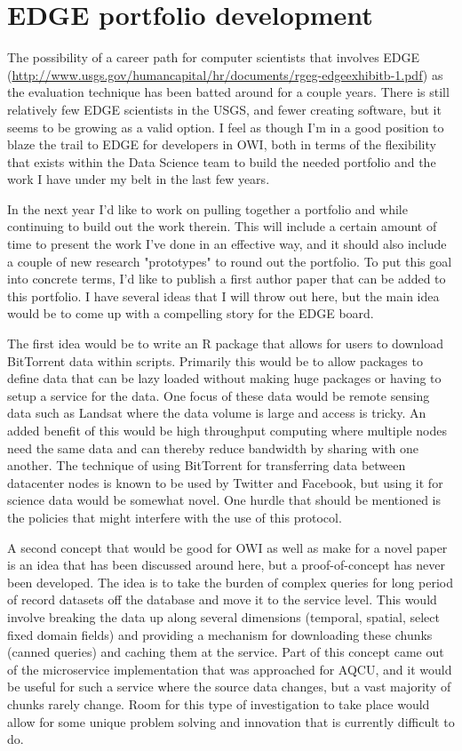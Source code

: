 \documentclass{article}
\begin{document}
\section{EDGE portfolio development}

The possibility of a career path for computer scientists that involves EDGE (\url{http://www.usgs.gov/humancapital/hr/documents/rgeg-edgeexhibitb-1.pdf}) as the evaluation technique has been batted around for a couple years.
There is still relatively few EDGE scientists in the USGS, and fewer creating software, but it seems to be growing as a valid option.
I feel as though I'm in a good position to blaze the trail to EDGE for developers in OWI, both in terms of the flexibility that exists within the Data Science team to build the needed portfolio and the work I have under my belt in the last few years.

In the next year I'd like to work on pulling together a portfolio and while continuing to build out the work therein.
This will include a certain amount of time to present the work I've done in an effective way, and it should also include a couple of new research "prototypes" to round out the portfolio.
To put this goal into concrete terms, I'd like to publish a first author paper that can be added to this portfolio.
I have several ideas that I will throw out here, but the main idea would be to come up with a compelling story for the EDGE board.

The first idea would be to write an R package that allows for users to download BitTorrent data within scripts.
Primarily this would be to allow packages to define data that can be lazy loaded without making huge packages or having to setup a service for the data.
One focus of these data would be remote sensing data such as Landsat where the data volume is large and access is tricky.
An added benefit of this would be high throughput computing where multiple nodes need the same data and can thereby reduce bandwidth by sharing with one another.
The technique of using BitTorrent for transferring data between datacenter nodes is known to be used by Twitter and Facebook, but using it for science data would be somewhat novel.
One hurdle that should be mentioned is the policies that might interfere with the use of this protocol.

A second concept that would be good for OWI as well as make for a novel paper is an idea that has been discussed around here, but a proof-of-concept has never been developed.
The idea is to take the burden of complex queries for long period of record datasets off the database and move it to the service level.
This would involve breaking the data up along several dimensions (temporal, spatial, select fixed domain fields) and providing a mechanism for downloading these chunks (canned queries) and caching them at the service.
Part of this concept came out of the microservice implementation that was approached for AQCU, and it would be useful for such a service where the source data changes, but a vast majority of chunks rarely change.
Room for this type of investigation to take place would allow for some unique problem solving and innovation that is currently difficult to do.
\end{document}
